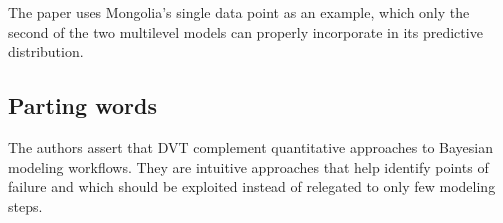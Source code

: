 \documentclass[runningheads]{llncs}
\begin{document}
The paper uses Mongolia's single data point as an example, which only the second of the two multilevel models can properly incorporate in its predictive distribution.

\subsection*{Parting words}

The authors assert that DVT complement quantitative approaches to Bayesian modeling workflows. They are intuitive approaches that help identify points of failure and which should be exploited instead of relegated to only few modeling steps.\\




\end{document}
